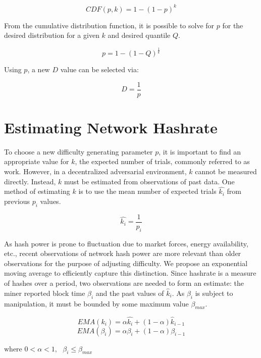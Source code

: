 \documentclass[]{article}
\begin{document}
\begin{equation}
CDF(p, k) = 1 - (1 - p)^k
\end{equation}

\pagebreak
From the cumulative distribution function, it is possible to solve for $p$ for the desired distribution for a given $k$ and desired quantile $Q$.

\begin{equation}
p = 1 - (1 - Q)^\frac{1}{k}
\end{equation}

Using $p$, a new $D$ value can be selected via:

\begin{equation}
D = \frac{1}{p}
\end{equation}

\section{Estimating Network Hashrate}
To choose a new difficulty generating parameter $p$, it is important to find an appropriate value for $k$, the expected number of trials, commonly referred to as work.  However, in a decentralized adversarial environment, $k$ cannot be measured directly.  Instead, $k$ must be estimated from observations of past data.  One method of estimating $k$ is to use the mean number of expected trials $\hat{k_i} $ from previous $p_i$ values.  
 
\begin{equation}
\hat{k_{i}} = \frac{1}{p_{i}}
\end{equation}

As hash power is prone to fluctuation due to market forces, energy availability, etc., recent observations of network hash power are more relevant than older observations for the purpose of adjusting difficulty.  We propose an exponential moving average to efficiently capture this distinction.  Since hashrate is a measure of hashes over a period, two observations are needed to form an estimate: the miner reported block time $\beta_i$ and the past values of $\hat{k}_i$.  As $\beta_i$ is subject to manipulation, it must be bounded by some maximum value $\beta_{max}$.  

\begin{equation}
EMA(k_{i}) = \alpha \hat{k_{i}} + (1 - \alpha) \hat{k}_{i - 1}
\end{equation} 
\begin{equation}
EMA(\beta_{i}) = \alpha \beta_{i} + (1 - \alpha) \beta_{i - 1} 
\end{equation}
\centerline{$\text{where } 0 < \alpha < 1, \text{ } \beta_{i} \leq \beta_{max}$}
\newline
\end{document}
